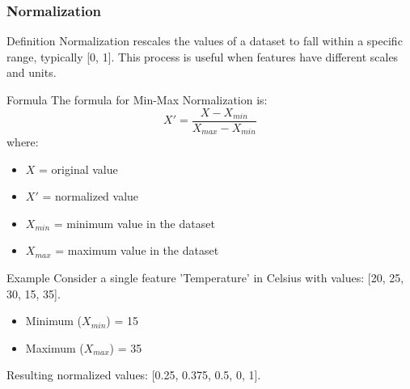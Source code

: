 \documentclass[aspectratio=169]{beamer}
\begin{document}
\begin{frame}[fragile]
    \frametitle{Normalization}
    \begin{block}{Definition}
        Normalization rescales the values of a dataset to fall within a specific range, typically [0, 1]. This process is useful when features have different scales and units.
    \end{block}

    \begin{block}{Formula}
        The formula for Min-Max Normalization is:
        \begin{equation}
        X' = \frac{X - X_{min}}{X_{max} - X_{min}}
        \end{equation}
        where:
        \begin{itemize}
            \item \(X\) = original value
            \item \(X'\) = normalized value
            \item \(X_{min}\) = minimum value in the dataset
            \item \(X_{max}\) = maximum value in the dataset
        \end{itemize}
    \end{block}

    \begin{block}{Example}
        Consider a single feature 'Temperature' in Celsius with values: [20, 25, 30, 15, 35]. 
        \begin{itemize}
            \item Minimum (\(X_{min}\)) = 15
            \item Maximum (\(X_{max}\)) = 35
        \end{itemize}
        Resulting normalized values: [0.25, 0.375, 0.5, 0, 1].
    \end{block}
\end{frame}
\end{document}
